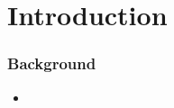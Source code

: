 




\section{Introduction}


\frame
{
  \frametitle{Background}                 

  \begin{itemize}
    \item 
  \end{itemize}
}


 





